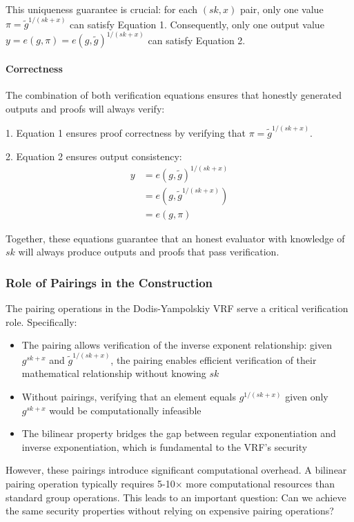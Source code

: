 This uniqueness guarantee is crucial: for each $(sk,x)$ pair, only one value $\pi = \tilde{g}^{1/(sk+x)}$ can satisfy Equation 1. Consequently, only one output value $y = e(g, \pi) = e(g, \tilde{g})^{1/(sk+x)}$ can satisfy Equation 2.

\paragraph{Correctness}
The combination of both verification equations ensures that honestly generated outputs and proofs will always verify:

1. Equation 1 ensures proof correctness by verifying that $\pi = \tilde{g}^{1/(sk+x)}$.

2. Equation 2 ensures output consistency:
\begin{align}
    y &= e(g, \tilde{g})^{1/(sk + x)} \\
    &= e(g, \tilde{g}^{1/(sk + x)}) \\
    &= e(g, \pi)
\end{align}

Together, these equations guarantee that an honest evaluator with knowledge of $sk$ will always produce outputs and proofs that pass verification.

\subsubsection{Role of Pairings in the Construction}

The pairing operations in the Dodis-Yampolskiy VRF serve a critical verification role. Specifically:

\begin{itemize}
    \item The pairing allows verification of the inverse exponent relationship: given $g^{sk+x}$ and $\tilde{g}^{1/(sk+x)}$, the pairing enables efficient verification of their mathematical relationship without knowing $sk$
    
    \item Without pairings, verifying that an element equals $g^{1/(sk+x)}$ given only $g^{sk+x}$ would be computationally infeasible
    
    \item The bilinear property bridges the gap between regular exponentiation and inverse exponentiation, which is fundamental to the VRF's security
\end{itemize}

However, these pairings introduce significant computational overhead. A bilinear pairing operation typically requires 5-10$\times$ more computational resources than standard group operations. This leads to an important question: Can we achieve the same security properties without relying on expensive pairing operations?

